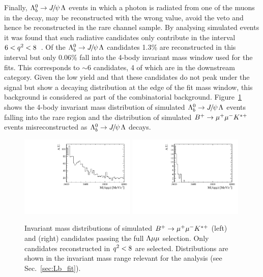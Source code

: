 Finally, $\Lb\ra\jpsi\Lz$ events 
in which a photon is radiated from one of the muons in the \jpsi decay, may be reconstructed 
with the wrong \qsq value, avoid the \jpsi veto and hence be 
reconstructed in the rare channel sample. By analysing simulated events it was found that 
such radiative candidates only contribute in the \qsq interval $6 < {q^2} < 8$~\gevgevcccc.
Of the $\Lb\to\jpsi\Lz$ candidates 1.3\%  are reconstructed in this \qsq interval but only 0.06\%
fall into the 4-body invariant mass window used for the fits. This corresponds to $\sim 6$
candidates, 4 of which are in the downstream category. Given the low yield and that these candidates do
not peak under the signal but show a decaying distribution at the edge of the fit mass window, this
background is considered as part of the combinatorial background.
Figure~\ref{fig:peakingBkgs} shows the 4-body invariant mass distribution of simulated $\Lb\ra\jpsi\Lz$
events falling into the rare \qsq region and the distribution of simulated $B^{+} \rightarrow{\ensuremath{\mu^+\mu^-}} K^{*+}$
events misreconstructed as $\Lb\ra\jpsi\Lz$ decays.
%
\begin{figure}
\centering
\includegraphics[width=0.49\textwidth]{Lmumu/figs/Bu2Kstplus_mass.pdf}
\includegraphics[width=0.49\textwidth]{Lmumu/figs/JpsiL_leakage_mass.pdf}
\caption{ Invariant mass distributions of simulated $B^{+} \rightarrow{\ensuremath{\mu^+\mu^-}} K^{*+}$ (left)
and \Lb\to\jpsi\Lz (right) candidates passing the full ${\Lambda}\mu\mu$ selection. Only \Lb\to\jpsi\Lz
candidates reconstructed in ${q^2} < 8$ \gevgevcccc are selected.
Distributions are shown in the invariant mass range relevant for the analysis 
(see Sec.~\ref{sec:Lb_fit}). }
\label{fig:peakingBkgs}
\end{figure}

